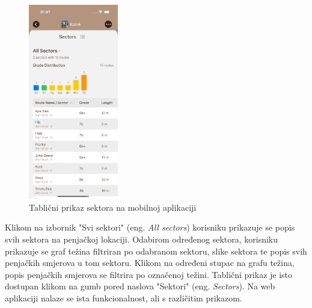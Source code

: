 \begin{figure}[H]
    \centering
    \includegraphics[width=0.35\textwidth]{images/implementacija/crag-details/crag-all-sectors-table.png}
    \caption{Tablični prikaz sektora na mobilnoj aplikaciji}
    \label{fig:tablični_prikaz_sektora}
\end{figure}

Klikom na izbornik "Svi sektori" (eng. \textit{All sectors}) korisniku prikazuje se popis svih sektora na penjačkoj lokaciji. Odabirom određenog sektora, korisniku prikazuje se graf težina filtriran po odabranom sektoru, slike sektora te popis svih penjačkih smjerova u tom sektoru. Klikom na određeni stupac na grafu težina, popis penjačkih smjerova se filtrira po označenoj težini. Tablični prikaz je isto dostupan klikom na gumb pored naslova "Sektori" (eng. \textit{Sectors}). Na web aplikaciji nalaze se ista funkcionalnost, ali s različitim prikazom.

